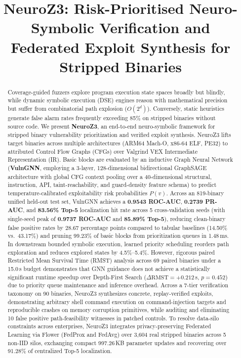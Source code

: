 \documentclass[10pt,conference]{IEEEtran}
\begin{document}
\title{NeuroZ3: Risk-Prioritised Neuro-Symbolic Verification and Federated Exploit Synthesis for Stripped Binaries}

\author{\IEEEauthorblockN{\vspace{-2.2em}}}

\maketitle

\begin{abstract}
Coverage-guided fuzzers explore program execution state spaces broadly but blindly, while dynamic symbolic execution (DSE)
engines reason with mathematical precision but suffer from combinatorial path explosion ($O(2^d)$). Conversely, static
heuristics generate false alarm rates frequently exceeding 85\% on stripped binaries without source code. We present
\textbf{NeuroZ3}, an end-to-end neuro-symbolic framework for stripped binary vulnerability prioritization and verified exploit
synthesis. NeuroZ3 lifts target binaries across multiple architectures (ARM64 Mach-O, x86-64 ELF, PE32) to attributed Control
Flow Graphs (CFGs) over Valgrind VEX Intermediate Representation (IR). Basic blocks are evaluated by an inductive Graph Neural
Network (\textbf{VulnGNN}, employing a 3-layer, 128-dimensional bidirectional GraphSAGE architecture with global CFG context
pooling over a 40-dimensional structural, instruction, API, taint-reachability, and guard-density feature schema) to predict
temperature-calibrated exploitability risk probabilities $P(v)$. Across an 819-binary unified held-out test set, VulnGNN achieves
a \textbf{0.9543 ROC-AUC}, \textbf{0.2739 PR-AUC}, and \textbf{83.56\% Top-5} localization hit rate across 5 cross-validation seeds
(with single-seed peak of \textbf{0.9737 ROC-AUC} and \textbf{85.89\% Top-5}), reducing clean-binary false positive rates by
28.67 percentage points compared to tabular baselines (14.50\% vs.\ 43.17\%) and pruning 99.23\% of basic blocks from prioritization queues in 1.48\,ms.
In downstream bounded symbolic execution, learned priority scheduling reorders path exploration and reduces explored states by
4.5\%--5.4\%. However, rigorous paired Restricted Mean Survival Time (RMST) analysis across 69 paired binaries under a 15.0\,s
budget demonstrates that GNN guidance does not achieve a statistically significant runtime speedup over Depth-First Search
($\Delta\text{RMST} = +0.212$\,s, $p = 0.452$) due to priority queue maintenance and inference overhead. Across a 7-tier
verification taxonomy on 90 binaries, NeuroZ3 synthesizes concrete, replay-verified exploits, demonstrating arbitrary shell command
execution on command-injection targets and reproducible crashes on memory corruption primitives, while auditing and eliminating 10
false positive path-feasibility witnesses in patched controls. To resolve data-silo constraints across enterprises, NeuroZ3
integrates privacy-preserving Federated Learning via Flower (FedProx and FedAvg) over 3{,}604 real stripped binaries across 5
non-IID silos, exchanging compact 997.26\,KB parameter updates and recovering over 91.28\% of centralized Top-5 localization.
\end{abstract}
\end{document}
